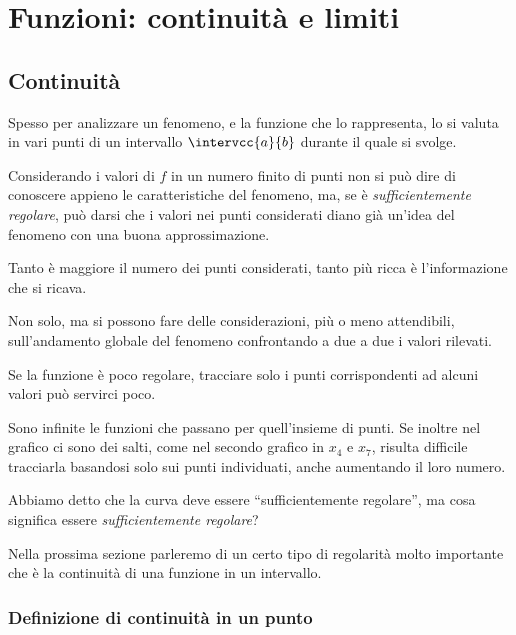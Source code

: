 

\chapter{Funzioni: continuità e limiti}

\section{Continuità}
\label{sec:cont_continuita}

Spesso per analizzare un fenomeno, e la funzione che lo rappresenta,  lo si 
valuta in vari punti di un intervallo \(\intervcc{a}{b}\) durante il 
quale si svolge.

{
Considerando i valori di \(f\) in un numero finito di punti non si può dire 
di conoscere appieno le caratteristiche del fenomeno, ma, se è 
\emph{sufficientemente regolare}, può darsi che i valori nei punti 
considerati diano già un'idea del fenomeno con una buona approssimazione.

Tanto è maggiore il numero dei punti considerati, tanto più ricca è 
l'informazione che si ricava. 

Non solo, ma si possono fare delle considerazioni, più o meno attendibili, 
sull'andamento globale del fenomeno confrontando a due a due i valori 
rilevati.
}
{\scalebox{1}{\partizionen}}

Se la funzione è poco regolare, tracciare solo i punti corrispondenti ad 
alcuni valori può servirci poco.

{\scalebox{1}{\puntigrafico}}
{\scalebox{1}{\graficodiscontinuo}}

Sono infinite le funzioni che passano per quell'insieme di punti. 
Se inoltre nel grafico ci sono dei salti, come nel secondo grafico
in \(x_4\) e \(x_7\), risulta difficile tracciarla 
basandosi solo sui punti individuati, anche aumentando il loro numero.

Abbiamo detto che la curva deve essere ``sufficientemente regolare'',
ma cosa significa essere \emph{sufficientemente regolare}?

Nella prossima sezione parleremo di un certo tipo di regolarità molto 
importante che è la continuità di una funzione in un intervallo.

\subsection{Definizione di continuità in un punto}
\label{subsec:cont_definizione}

